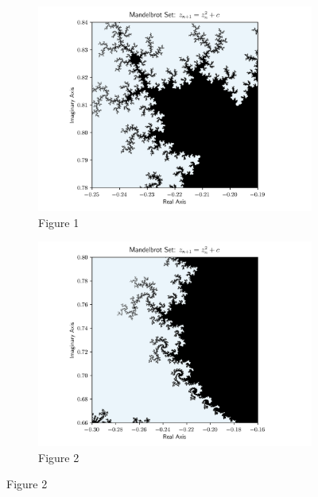 \documentclass[14pts]{article}
\begin{document}
    \begin{figure}[!h]
        \centering
        \begin{subfigure}{.8\textwidth}
            \includegraphics[width = \textwidth]{Images/Mandelbrot_section1.png}
            \caption{Figure 1}
        \end{subfigure}
        \begin{subfigure}{.8\textwidth}
            \includegraphics[width = \textwidth]{Images/Mandelbrot_section2.png}
            \caption{Figure 2}
        \end{subfigure}
    \end{figure}
\end{document}
